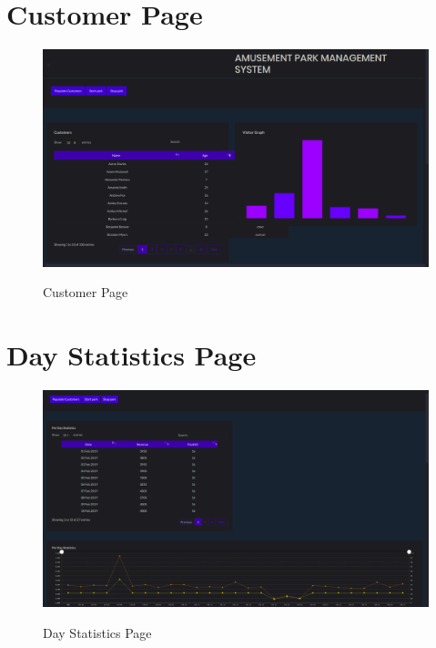 \thispagestyle{fancy}

\section{Customer Page}
\begin{figure}[H]
\caption{Customer Page}
\includegraphics[scale=.20]{./cst.png}
\\[0.2in]
\label{fig:Customer Page}
\end{figure}

\thispagestyle{fancy}


\section{Day Statistics Page}
\begin{figure}[H]
\caption{Day Statistics Page}
\includegraphics[scale=.20]{./day.png}
\\[0.2in]
\label{fig:Day Statistics Page}
\end{figure}

\thispagestyle{fancy}


